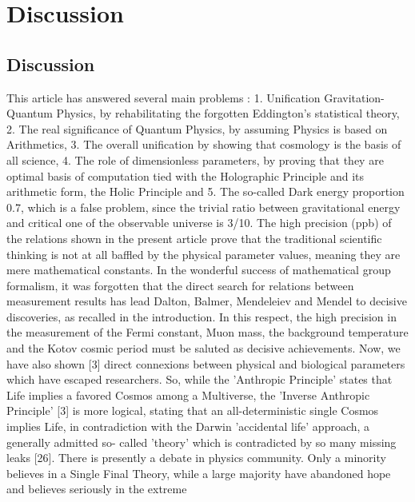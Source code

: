 \chapter{Discussion}
\label{chap:chapter_4}
\section {Discussion}

This article has answered several main problems : 1. Unification Gravitation-Quantum Physics,
by rehabilitating the forgotten Eddington's statistical theory, 2. The real significance of Quantum
Physics, by assuming Physics is based on Arithmetics, 3. The overall unification by showing that
cosmology is the basis of all science, 4. The role of dimensionless parameters, by proving that they
are optimal basis of computation tied with the Holographic Principle and its arithmetic form, the
Holic Principle and 5. The so-called Dark energy proportion 0.7, which is a false problem, since the
trivial ratio between gravitational energy and critical one of the observable universe is 3/10.
The high precision (ppb) of the relations shown in the present article prove that the traditional
scientific thinking is not at all baffled by the physical parameter values, meaning they are mere
mathematical constants. In the wonderful success of mathematical group formalism, it was
forgotten that the direct search for relations between measurement results has lead Dalton, Balmer,
Mendeleiev and Mendel to decisive discoveries, as recalled in the introduction. In this respect, the
high precision in the measurement of the Fermi constant, Muon mass, the background temperature
and the Kotov cosmic period must be saluted as decisive achievements. Now, we have also shown
[3] direct connexions between physical and biological parameters which have escaped researchers.
So, while the 'Anthropic Principle' states that Life implies a favored Cosmos among a Multiverse,
the 'Inverse Anthropic Principle' [3] is more logical, stating that an all-deterministic single Cosmos
implies Life, in contradiction with the Darwin 'accidental life' approach, a generally admitted so-
called 'theory' which is contradicted by so many missing leaks [26].
There is presently a debate in physics community. Only a minority believes in a Single Final
Theory, while a large majority have abandoned hope and believes seriously in the extreme
